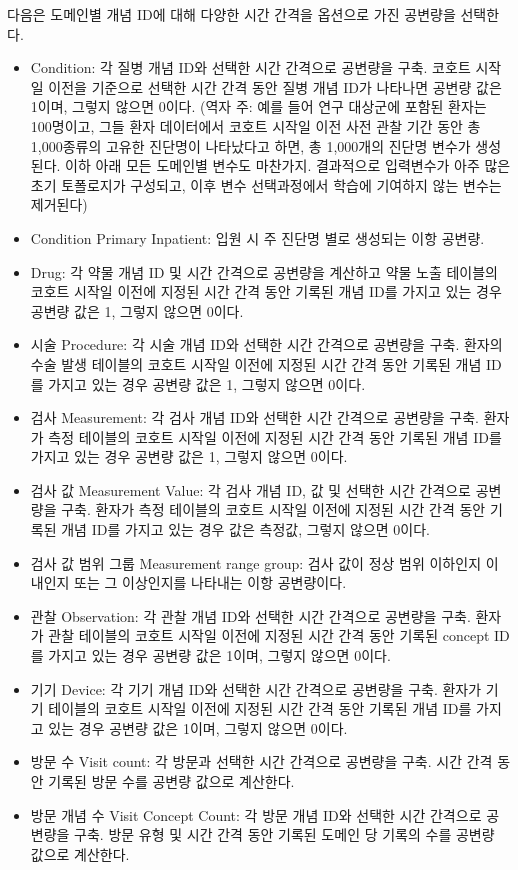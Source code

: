 \documentclass[10.5pt]{book}
\providecommand{\tightlist}{%
  \setlength{\itemsep}{0pt}\setlength{\parskip}{0pt}}
\theoremstyle{definition}
\theoremstyle{definition}
\theoremstyle{definition}
\theoremstyle{remark}
\begin{document}
다음은 도메인별 개념 ID에 대해 다양한 시간 간격을 옵션으로 가진 공변량을
선택한다.

\begin{itemize}
\tightlist
\item
  Condition: 각 질병 개념 ID와 선택한 시간 간격으로 공변량을 구축.
  코호트 시작일 이전을 기준으로 선택한 시간 간격 동안 질병 개념 ID가
  나타나면 공변량 값은 1이며, 그렇지 않으면 0이다. (역자 주: 예를 들어
  연구 대상군에 포함된 환자는 100명이고, 그들 환자 데이터에서 코호트
  시작일 이전 사전 관찰 기간 동안 총 1,000종류의 고유한 진단명이
  나타났다고 하면, 총 1,000개의 진단명 변수가 생성된다. 이하 아래 모든
  도메인별 변수도 마찬가지. 결과적으로 입력변수가 아주 많은 초기
  토폴로지가 구성되고, 이후 변수 선택과정에서 학습에 기여하지 않는
  변수는 제거된다)
\item
  Condition Primary Inpatient: 입원 시 주 진단명 별로 생성되는 이항
  공변량.
\item
  Drug: 각 약물 개념 ID 및 시간 간격으로 공변량을 계산하고 약물 노출
  테이블의 코호트 시작일 이전에 지정된 시간 간격 동안 기록된 개념 ID를
  가지고 있는 경우 공변량 값은 1, 그렇지 않으면 0이다.
\item
  시술 Procedure: 각 시술 개념 ID와 선택한 시간 간격으로 공변량을 구축.
  환자의 수술 발생 테이블의 코호트 시작일 이전에 지정된 시간 간격 동안
  기록된 개념 ID를 가지고 있는 경우 공변량 값은 1, 그렇지 않으면 0이다.
\item
  검사 Measurement: 각 검사 개념 ID와 선택한 시간 간격으로 공변량을
  구축. 환자가 측정 테이블의 코호트 시작일 이전에 지정된 시간 간격 동안
  기록된 개념 ID를 가지고 있는 경우 공변량 값은 1, 그렇지 않으면 0이다.
\item
  검사 값 Measurement Value: 각 검사 개념 ID, 값 및 선택한 시간 간격으로
  공변량을 구축. 환자가 측정 테이블의 코호트 시작일 이전에 지정된 시간
  간격 동안 기록된 개념 ID를 가지고 있는 경우 값은 측정값, 그렇지 않으면
  0이다.
\item
  검사 값 범위 그룹 Measurement range group: 검사 값이 정상 범위
  이하인지 이내인지 또는 그 이상인지를 나타내는 이항 공변량이다.
\item
  관찰 Observation: 각 관찰 개념 ID와 선택한 시간 간격으로 공변량을
  구축. 환자가 관찰 테이블의 코호트 시작일 이전에 지정된 시간 간격 동안
  기록된 concept ID를 가지고 있는 경우 공변량 값은 1이며, 그렇지 않으면
  0이다.
\item
  기기 Device: 각 기기 개념 ID와 선택한 시간 간격으로 공변량을 구축.
  환자가 기기 테이블의 코호트 시작일 이전에 지정된 시간 간격 동안 기록된
  개념 ID를 가지고 있는 경우 공변량 값은 1이며, 그렇지 않으면 0이다.
\item
  방문 수 Visit count: 각 방문과 선택한 시간 간격으로 공변량을 구축.
  시간 간격 동안 기록된 방문 수를 공변량 값으로 계산한다.
\item
  방문 개념 수 Visit Concept Count: 각 방문 개념 ID와 선택한 시간
  간격으로 공변량을 구축. 방문 유형 및 시간 간격 동안 기록된 도메인 당
  기록의 수를 공변량 값으로 계산한다.
\end{itemize}
\end{document}
